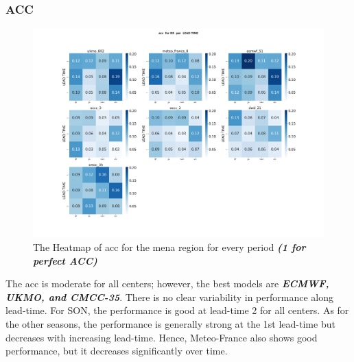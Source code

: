 \subsubsection{ACC}

\begin{figure}[H]
	\centering
	\includegraphics[scale=0.25]{plots/det/acc/acc_RR_mena.png}
	\caption{The Heatmap of acc for the mena region for every period \textbf{\textit{(1 for perfect ACC)} }}
\end{figure}
The acc is moderate for all centers; however, the best models are \textbf{\textit{ECMWF, UKMO, and CMCC-35}}. There is no clear variability in performance along lead-time. For SON, the performance is good at lead-time 2 for all centers. As for the other seasons, the performance is generally strong at the 1st lead-time but decreases with increasing lead-time.
Hence, Meteo-France also shows good performance, but it decreases significantly over time.



